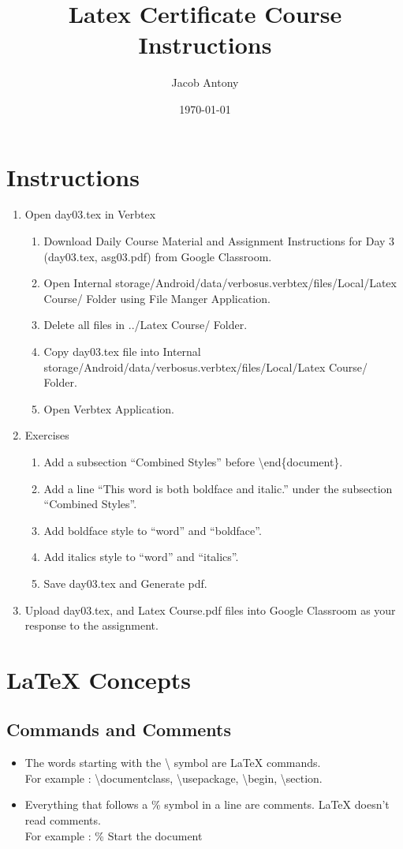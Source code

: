 \documentclass{article}
\title{Latex Certificate Course Instructions}
\author{Jacob Antony}
\date{\today}
\begin{document}
\maketitle

\section*{Instructions}

\begin{enumerate}
	\item Open day03.tex in Verbtex
	\begin{enumerate}
		\item Download Daily Course Material and Assignment Instructions for Day 3 (day03.tex, asg03.pdf) from Google Classroom.
		\item Open Internal storage/Android/data/verbosus.verbtex/files/Local/Latex Course/ Folder using File Manger Application.
		\item Delete all files in ../Latex Course/ Folder.
		\item Copy day03.tex file into Internal storage/Android/data/verbosus.verbtex/files/Local/Latex Course/  Folder.
		\item Open Verbtex Application.
	\end{enumerate}
	\item Exercises
	\begin{enumerate}
		\item Add a subsection ``Combined Styles'' before \textbackslash{}end\{document\}.
		\item Add a line ``This word is both boldface and italic.'' under the subsection ``Combined Styles''.
		\item Add boldface style to ``word'' and ``boldface''.
		\item Add italics style to ``word'' and ``italics''.
		\item Save day03.tex and Generate pdf.
	\end{enumerate}
	\item Upload day03.tex, and Latex Course.pdf files into Google Classroom as your response to the assignment.
\end{enumerate}

\section{\LaTeX{} Concepts}

\subsection{Commands and Comments}
\begin{itemize}
	\item The words starting with the \textbackslash{} symbol are \LaTeX{} commands.\\ For example : \textbackslash{}documentclass, \textbackslash{}usepackage, \textbackslash{}begin, \textbackslash{}section.
	\item Everything that follows a \% symbol in a line are comments. \LaTeX{} doesn't read comments.\\ For example : \% Start the document
\end{itemize}
\end{document}
